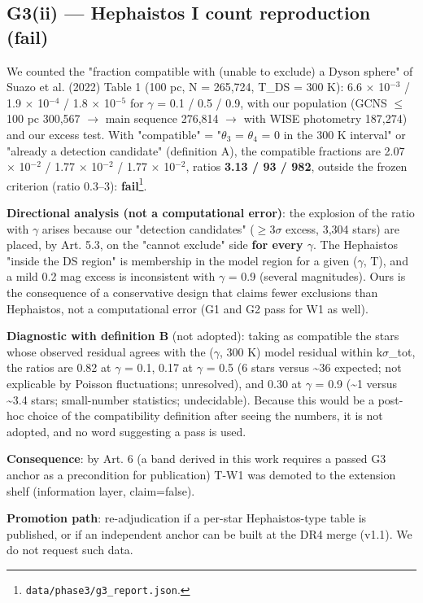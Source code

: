 \documentclass{aa}
\begin{document}
\subsection{G3(ii) --- Hephaistos I count reproduction (fail)}
\noindent We counted the "fraction compatible with (unable to exclude) a Dyson sphere" of Suazo et al. (2022) Table 1 (100 pc, N = 265,724, T\_DS = 300 K): 6.6 \(\times\) 10\(^{-3}\) / 1.9 \(\times\) 10\(^{-4}\) / 1.8 \(\times\) 10\(^{-5}\) for \(\gamma\) = 0.1 / 0.5 / 0.9, with our population (GCNS \(\leq\)100 pc 300,567 \(\rightarrow\) main sequence 276,814 \(\rightarrow\) with WISE photometry 187,274) and our excess test. With "compatible" = "\(\theta\)\(_{3}\) = \(\theta\)\(_{4}\) = 0 in the 300 K interval" or "already a detection candidate" (definition A), the compatible fractions are 2.07 \(\times\) 10\(^{-2}\) / 1.77 \(\times\) 10\(^{-2}\) / 1.77 \(\times\) 10\(^{-2}\), ratios \textbf{3.13 / 93 / 982}, outside the frozen criterion (ratio 0.3--3): \textbf{fail}\footnote{\texttt{data/phase3/g3\_report.json}.}.\par\smallskip
\noindent \textbf{Directional analysis (not a computational error)}: the explosion of the ratio with \(\gamma\) arises because our "detection candidates" (\(\geq\)3\(\sigma\) excess, 3,304 stars) are placed, by Art. 5.3, on the "cannot exclude" side \textbf{for every \(\gamma\)}. The Hephaistos "inside the DS region" is membership in the model region for a given (\(\gamma\), T), and a mild 0.2 mag excess is inconsistent with \(\gamma\) = 0.9 (several magnitudes). Ours is the consequence of a conservative design that claims fewer exclusions than Hephaistos, not a computational error (G1 and G2 pass for W1 as well).\par\smallskip
\noindent \textbf{Diagnostic with definition B} (not adopted): taking as compatible the stars whose observed residual agrees with the (\(\gamma\), 300 K) model residual within k\(\sigma\)\_tot, the ratios are 0.82 at \(\gamma\) = 0.1, 0.17 at \(\gamma\) = 0.5 (6 stars versus \textasciitilde{}36 expected; not explicable by Poisson fluctuations; unresolved), and 0.30 at \(\gamma\) = 0.9 (\textasciitilde{}1 versus \textasciitilde{}3.4 stars; small-number statistics; undecidable). Because this would be a post-hoc choice of the compatibility definition after seeing the numbers, it is not adopted, and no word suggesting a pass is used.\par\smallskip
\noindent \textbf{Consequence}: by Art. 6 (a band derived in this work requires a passed G3 anchor as a precondition for publication) T-W1 was demoted to the extension shelf (information layer, claim=false).\par\smallskip
\noindent \textbf{Promotion path}: re-adjudication if a per-star Hephaistos-type table is published, or if an independent anchor can be built at the DR4 merge (v1.1). We do not request such data.\par\smallskip
\end{document}
